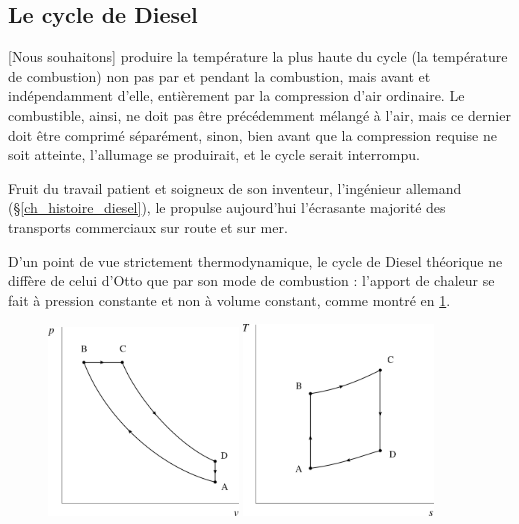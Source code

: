 	\subsection{Le cycle de Diesel}
	\label{ch_cycle_diesel}

			[Nous souhaitons] produire la température la plus haute du cycle (la température de combustion) non pas par et pendant la combustion, mais avant et indépendamment d’elle, entièrement par la compression d’air ordinaire. \jecourte
Le combustible, ainsi, ne doit pas être précédemment mélangé à l’air, mais ce dernier doit être comprimé séparément, sinon, bien avant que la compression requise ne soit atteinte, l’allumage se produirait, et le cycle serait interrompu.
		
		Fruit du travail patient et soigneux de son inventeur, l’ingénieur allemand  (\S\ref{ch_histoire_diesel}), le  propulse aujourd’hui l’écrasante majorité des transports commerciaux sur route et sur mer.

		D’un point de vue strictement thermodynamique, le cycle de Diesel théorique ne diffère de celui d’Otto que par son mode de combustion : l’apport de chaleur se fait à pression constante et non à volume constant, comme montré en \cref{fig_cycle_diesel}.

		\begin{figure}
			\begin{center}
				\includegraphics[width=0.45\textwidth]{images/pv_gp_diesel.png}
				\includegraphics[width=0.45\textwidth]{images/ts_gp_diesel.png}
			\end{center}
			\label{fig_cycle_diesel}
		\end{figure}

